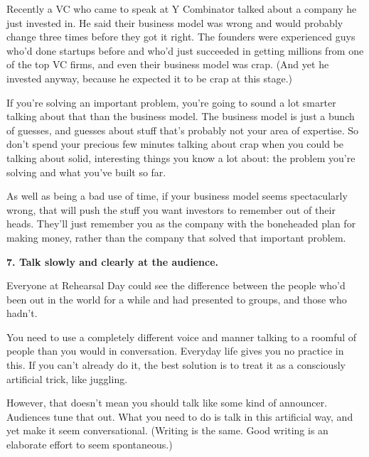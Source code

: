Recently
                    a VC who came to speak at Y Combinator talked about a
                    company he just invested in. He said their business model
                    was wrong and would probably change three times before they
                    got it right. The founders were experienced guys who'd done
                    startups before and who'd just succeeded in getting millions
                    from one of the top VC firms, and even their business model
                    was crap. (And yet he invested anyway, because he expected
                    it to be crap at this stage.)

If you're solving
                    an important problem, you're going to sound a lot smarter
                    talking about that than the business model. The business
                    model is just a bunch of guesses, and guesses about stuff
                    that's probably not your area of expertise. So don't spend
                    your precious few minutes talking about crap when you could
                    be talking about solid, interesting things you know a lot
                    about: the problem you're solving and what you've built so
                    far.

As well as being a bad use of time, if your
                    business model seems spectacularly wrong, that will push the
                    stuff you want investors to remember out of their heads.
                    They'll just remember you as the company with the boneheaded
                    plan for making money, rather than the company that solved
                    that important problem.

\textbf{7. Talk slowly and clearly at the audience.}

Everyone at Rehearsal Day could see the
                    difference between the people who'd been out in the world
                    for a while and had presented to groups, and those who
                    hadn't.

You need to use a completely different
                    voice and manner talking to a roomful of people than you
                    would in conversation. Everyday life gives you no practice
                    in this. If you can't already do it, the best solution is to
                    treat it as a consciously artificial trick, like
                    juggling.

However, that doesn't mean you should
                    talk like some kind of announcer. Audiences tune that out.
                    What you need to do is talk in this artificial way, and yet
                    make it seem conversational. (Writing is the same. Good
                    writing is an elaborate effort to seem spontaneous.)

